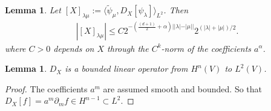 \documentclass[letterpaper, 10 pt, conference]{ieeeconf}
\newtheorem{lem}[thm]{Lemma}
\begin{document}
\begin{lem} \label{lem:entry_bounds}
  Let $[X]_{\lambda\mu} := \langle \tilde{\psi}_\mu, D_X[\psi_\lambda] \rangle_{L^2}$.  Then
  \begin{align*}
    | [X]_{\lambda \mu} |\leq C 2^{- \left(\frac{(d+1)}{2}+ \alpha \right)| |\lambda| - |\mu| | }
    2^{( |\lambda | + |\mu|)/2}.
  \end{align*}
  where $C > 0$ depends on $X$ through the $C^k$-norm of the coefficients $a^\alpha$.
\end{lem}

\begin{lem} \label{lem:DX_is_bounded}
  $D_X$ is a bounded linear operator from $H^n(V)$ to $L^2(V)$.
\end{lem}
\begin{proof}
  The coefficients $a^m$ are assumed smooth and bounded.
  So that $D_X [f] = a^m \partial_m f \in H^{n-1} \subset L^2$.
\end{proof}
\end{document}
